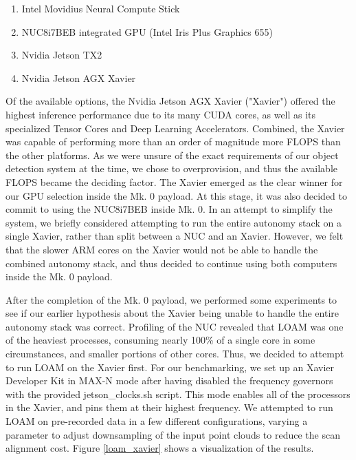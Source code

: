 \begin{enumerate}
	\item Intel Movidius Neural Compute Stick
	\item NUC8i7BEB integrated GPU (Intel Iris Plus Graphics 655)
	\item Nvidia Jetson TX2
	\item Nvidia Jetson AGX Xavier
\end{enumerate}

Of the available options, the Nvidia Jetson AGX Xavier ("Xavier") offered the highest inference performance due to its many CUDA cores, as well as its specialized Tensor Cores and Deep Learning Accelerators. Combined, the Xavier was capable of performing more than an order of magnitude more FLOPS than the other platforms. As we were unsure of the exact requirements of our object detection system at the time, we chose to overprovision, and thus the available FLOPS became the deciding factor. The Xavier emerged as the clear winner for our GPU selection inside the Mk. 0 payload. At this stage, it was also decided to commit to using the NUC8i7BEB inside Mk. 0. In an attempt to simplify the system, we briefly considered attempting to run the entire autonomy stack on a single Xavier, rather than split between a NUC and an Xavier. However, we felt that the slower ARM cores on the Xavier would not be able to handle the combined autonomy stack, and thus decided to continue using both computers inside the Mk. 0 payload.

After the completion of the Mk. 0 payload, we performed some experiments to see if our earlier hypothesis about the Xavier being unable to handle the entire autonomy stack was correct. Profiling of the NUC revealed that LOAM was one of the heaviest processes, consuming nearly 100\% of a single core in some circumstances, and smaller portions of other cores. Thus, we decided to attempt to run LOAM on the Xavier first. For our benchmarking, we set up an Xavier Developer Kit in MAX-N mode after having disabled the frequency governors with the provided jetson\_clocks.sh script. This mode enables all of the processors in the Xavier, and pins them at their highest frequency. We attempted to run LOAM on pre-recorded data in a few different configurations, varying a parameter to adjust downsampling of the input point clouds to reduce the scan alignment cost. Figure \ref{loam_xavier} shows a visualization of the results.

